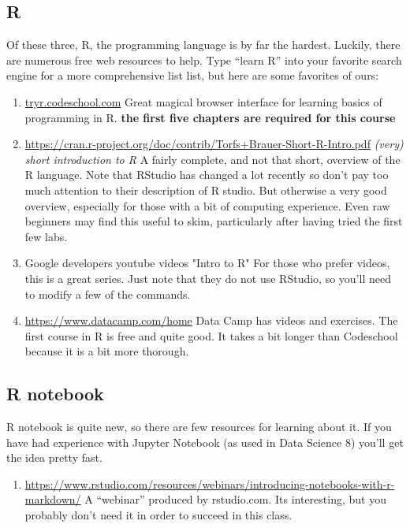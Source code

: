 \documentclass[11pt]{article}
\begin{document}
\subsection{R}
\label{sec:R}

Of these three, R, the programming language is by far the hardest. Luckily, there are numerous free web resources to help.
Type ``learn R'' into your favorite search engine for a more comprehensive list list, but here are some favorites of ours:

\begin{enumerate}
\item \url{tryr.codeschool.com}  Great magical browser interface for learning basics of  programming in R. \textbf{the first five chapters are required for this course}

\item
  \url{https://cran.r-project.org/doc/contrib/Torfs+Brauer-Short-R-Intro.pdf}
  \emph{(very) short introduction to R} A fairly complete, and not
  that short, overview of the R language. Note that RStudio has
  changed a lot recently so don't pay too much attention to their
  description of R studio. But otherwise a very good overview,
  especially for those with a bit of computing experience. Even raw
  beginners may find this useful to skim, particularly after having
  tried the first few labs.

\item Google developers youtube videos "Intro to R"
For those who prefer videos, this is a great series. Just note that
they do not use RStudio, so you'll need to modify a few of the
commands. 

\item \url{https://www.datacamp.com/home} Data Camp has videos and exercises. The first course in R is free and quite good.  It takes a bit longer than Codeschool because it is a bit more thorough. 





\end{enumerate}

\subsection{R notebook}
\label{sec:Rnote}

R notebook is quite new, so there are few resources for learning about it. If you have had experience with Jupyter Notebook (as used in Data Science 8) you'll get the idea pretty fast. 
\begin{enumerate}
\item \url{https://www.rstudio.com/resources/webinars/introducing-notebooks-with-r-markdown/} A ``webinar'' produced by rstudio.com.  Its interesting, but you probably don't need it in order to succeed in this class.
\end{enumerate}
\end{document}
